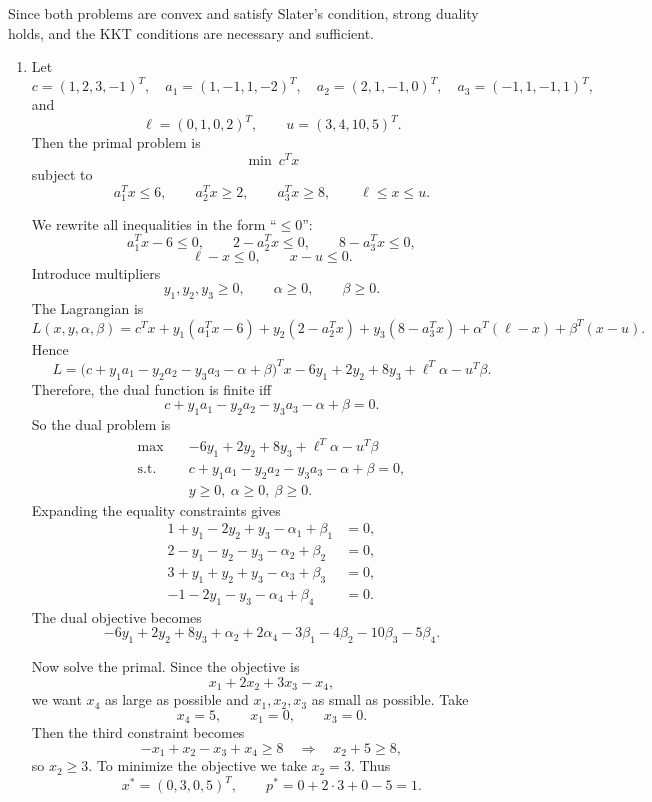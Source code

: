 \documentclass[11pt,letter,notitlepage]{article}
\theoremstyle{definition}
\begin{document}
\begin{solution}

Since both problems are convex and satisfy Slater's condition, strong duality holds, and the KKT conditions are necessary and sufficient.

\begin{enumerate}[label=(\alph*)]

\item
Let
\[
c=(1,2,3,-1)^T,\quad
a_1=(1,-1,1,-2)^T,\quad
a_2=(2,1,-1,0)^T,\quad
a_3=(-1,1,-1,1)^T,
\]
and
\[
\ell=(0,1,0,2)^T,\qquad u=(3,4,10,5)^T.
\]
Then the primal problem is
\[
\min\ c^Tx
\]
subject to
\[
a_1^Tx\le 6,\qquad a_2^Tx\ge 2,\qquad a_3^Tx\ge 8,\qquad \ell\le x\le u.
\]

We rewrite all inequalities in the form ``$\le 0$'':
\[
a_1^Tx-6\le 0,\qquad 2-a_2^Tx\le 0,\qquad 8-a_3^Tx\le 0,
\]
\[
\ell-x\le 0,\qquad x-u\le 0.
\]
Introduce multipliers
\[
y_1,y_2,y_3\ge 0,\qquad \alpha\ge 0,\qquad \beta\ge 0.
\]
The Lagrangian is
\[
L(x,y,\alpha,\beta)
=
c^Tx+y_1(a_1^Tx-6)+y_2(2-a_2^Tx)+y_3(8-a_3^Tx)
+\alpha^T(\ell-x)+\beta^T(x-u).
\]
Hence
\[
L
=
\big(c+y_1a_1-y_2a_2-y_3a_3-\alpha+\beta\big)^Tx
-6y_1+2y_2+8y_3+\ell^T\alpha-u^T\beta.
\]
Therefore, the dual function is finite iff
\[
c+y_1a_1-y_2a_2-y_3a_3-\alpha+\beta=0.
\]
So the dual problem is
\[
\begin{aligned}
\max\quad &
-6y_1+2y_2+8y_3+\ell^T\alpha-u^T\beta \\
\text{s.t.}\quad &
c+y_1a_1-y_2a_2-y_3a_3-\alpha+\beta=0,\\
& y\ge 0,\ \alpha\ge 0,\ \beta\ge 0.
\end{aligned}
\]
Expanding the equality constraints gives
\[
\begin{aligned}
1+y_1-2y_2+y_3-\alpha_1+\beta_1 &=0,\\
2-y_1-y_2-y_3-\alpha_2+\beta_2 &=0,\\
3+y_1+y_2+y_3-\alpha_3+\beta_3 &=0,\\
-1-2y_1-y_3-\alpha_4+\beta_4 &=0.
\end{aligned}
\]
The dual objective becomes
\[
-6y_1+2y_2+8y_3+\alpha_2+2\alpha_4-3\beta_1-4\beta_2-10\beta_3-5\beta_4.
\]

Now solve the primal. Since the objective is
\[
x_1+2x_2+3x_3-x_4,
\]
we want \(x_4\) as large as possible and \(x_1,x_2,x_3\) as small as possible. Take
\[
x_4=5,\qquad x_1=0,\qquad x_3=0.
\]
Then the third constraint becomes
\[
-x_1+x_2-x_3+x_4\ge 8
\quad\Longrightarrow\quad
x_2+5\ge 8,
\]
so \(x_2\ge 3\). To minimize the objective we take \(x_2=3\). Thus
\[
x^*=(0,3,0,5)^T,
\qquad
p^*=0+2\cdot 3+0-5=1.
\]


\end{enumerate}
\end{solution}
\end{document}
